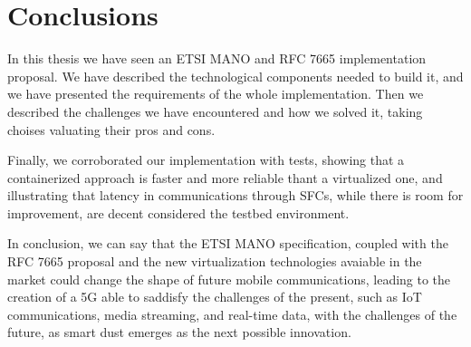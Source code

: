 \chapter{Conclusions}
\label{chap:conclusions}

In this thesis we have seen an ETSI MANO and RFC 7665 implementation proposal. 
We have described the technological components needed to build it, and we have 
presented the requirements of the whole implementation. Then we described 
the challenges we have encountered and how we solved it, taking choises 
valuating their pros and cons.

Finally, we corroborated our implementation with tests, showing that a 
containerized approach is faster and more reliable thant a virtualized one,
and illustrating that latency in communications through SFCs, while there 
is room for improvement, are decent considered the testbed environment.

In conclusion, we can say that the ETSI MANO specification, coupled with the 
RFC 7665 proposal and the new virtualization technologies avaiable in the 
market could change the shape of future mobile communications, leading to the 
creation of a 5G able to saddisfy the challenges of the present, such as IoT 
communications, media streaming, and real-time data, with the challenges of the 
future, as smart dust emerges as the next possible innovation.
